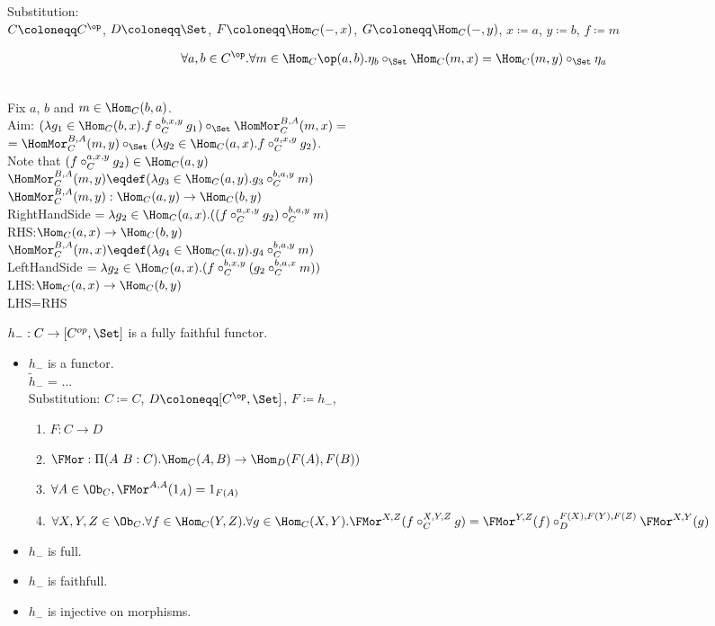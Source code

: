 \documentclass[10pt,a4paper]{article}
\begin{document}
Substitution:\\
$C \coloneqq C^\op$, $D \coloneqq \Set$, $F \coloneqq \Hom_C(-,x)$, $G \coloneqq \Hom_C(-,y)$, $x \coloneqq a$, $y \coloneqq b$, $f \coloneqq m$
\begin{lemma}
$$\forall a,b\in C^\op. \forall m\in \Hom_C\op (a,b).\eta_b \circ_\Set \Hom_C(m,x)=\Hom_C(m,y)\circ_\Set\eta_a$$
\end{lemma}
\myprf\\
Fix $a$, $b$ and $m\in\Hom_C(b,a)$.\\
Aim: $(\lambda g_1 \in \Hom_C(b,x). f\circ^{b,x,y}_C g_1)\circ_\Set \HomMor_C^{B,A}(m,x) = $\\
$=\HomMor_C^{B,A}(m,y) \circ_\Set (\lambda g_2 \in \Hom_C(a,x). f\circ^{a,x,y}_C g_2)$.\\
Note that $(f\circ^{a,x,y}_C g_2) \in \Hom_C(a,y)$\\
$\HomMor_C^{B,A}(m,y) \eqdef (\lambda g_3 \in \Hom_C(a,y). g_3\circ^{b,a,y}_C m)$\\
$\HomMor_C^{B,A}(m,y) : \Hom_C(a,y) \to \Hom_C(b,y)$\\
RightHandSide $= \lambda g_2 \in \Hom_C(a,x). ((f \circ_C^{a,x,y} g_2) \circ_C^{b,a,y} m )$\\
RHS:$\Hom_C(a,x) \to \Hom_C(b,y)$\\
$\HomMor_C^{B,A}(m,x) \eqdef (\lambda g_4 \in \Hom_C(a,y). g_4\circ^{b,a,y}_C m)$\\
LeftHandSide $= \lambda g_2 \in \Hom_C(a,x). (f \circ_C^{b,x,y} (g_2 \circ_C^{b,a,x} m ))$\\
LHS:$\Hom_C(a,x) \to \Hom_C(b,y)$\\
LHS=RHS\\
\myqed
\begin{lemma}
$h_{-}:C\rightarrow [C^{op},\Set]$ is a fully faithful functor.
\end{lemma}
\myprf
\begin{itemize}
\item $h_-$ is a functor.\\
$\widetilde{h}_-$ = ...\\
Substitution: $C\coloneqq C$, $D\coloneqq [C^\op,\Set]$, $F\coloneqq h_-$,
\begin{enumerate}
\item $F:C \to D$
\item $\FMor:\Pi(A\ B:C).\Hom_C(A,B) \to \Hom_D(F(A), F(B))$
\item $\forall A\in \Ob_C, \FMor^{A,A}(1_A)=1_{F(A)}$
\item $\forall X,Y,Z \in \Ob_C.\forall f\in\Hom_C(Y,Z).\forall g\in\Hom_C(X,Y). \FMor^{X,Z}(f\circ_C^{X,Y,Z} g)=\FMor^{Y,Z}(f)\circ_D^{F(X),F(Y),F(Z)} \FMor^{X,Y}(g)$
\end{enumerate}
\item $h_-$ is full.
\item $h_-$ is faithfull.
\item $h_-$ is injective on morphisms.
\end{itemize}
\end{document}
